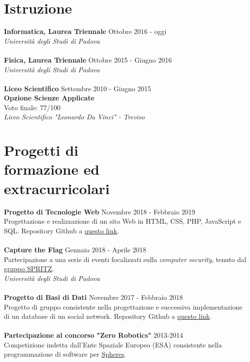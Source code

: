 \documentclass[margin, 10pt]{res}
\begin{document}
\begin{resume}
\section{Istruzione}
\textbf{Informatica, Laurea Triennale} \hfill Ottobre 2016 - oggi \\
\textit{Università degli Studi di Padova} \\ \\
\textbf{Fisica, Laurea Triennale} \hfill Ottobre 2015 - Giugno 2016 \\
\textit{Università degli Studi di Padova} \\ \\
\textbf{Liceo Scientifico} \hfill Settembre 2010 - Giugno 2015 \\
\textbf{Opzione Scienze Applicate} \\
Voto finale: 77/100 \\
\textit{Liceo Scientifico "Leonardo Da Vinci" - Treviso} 


\section{Progetti di \\ formazione ed \\ extracurricolari}
\textbf{Progetto di Tecnologie Web} \hfill Novembre 2018 - Febbraio 2019 \\
Progettazione e realizzazione di un sito Web in HTML, CSS, PHP, JavaScript e SQL. Repository Github a \href{https://github.com/enricobu96/TecWebUNIPD}{questo link}. \\ \\
\textbf{Capture the Flag} \hfill Gennaio 2018 - Aprile 2018 \\
Partecipazione a una serie di eventi focalizzati sulla \textit{computer security}, tenuto dal \href{https://spritz.math.unipd.it/}{gruppo SPRITZ}. \\
\textit{Università degli Studi di Padova} \\ \\
\textbf{Progetto di Basi di Dati} \hfill Novembre 2017 - Febbraio 2018 \\
Progetto di gruppo consistente nella progettazione e successiva implementazione di un database di un social network. Repository Github a \href{https://github.com/enricobu96/DB1718}{questo link}. \\ \\
\textbf{Partecipazione al concorso "Zero Robotics"} \hfill 2013-2014 \\
Competizione indetta dall'Ente Spaziale Europeo (ESA) consistente nella programmazione di software per \href{https://www.esa.int/Science_Exploration/Human_and_Robotic_Exploration/Education/Robot_Spheres_in_zero-gravity_action}{Spheres}.


\end{resume}
\end{document}
